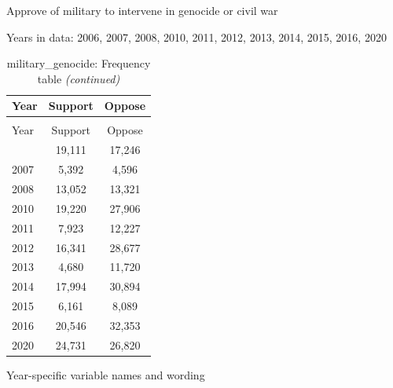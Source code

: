 \documentclass[
  12pt]{article}
\begin{document}
Approve of military to intervene in genocide or civil war

Years in data: 2006, 2007, 2008, 2010, 2011, 2012, 2013, 2014, 2015,
2016, 2020\begingroup\fontsize{10}{12}\selectfont

\begin{longtable}[t]{lcc}
\caption{\label{tab:unnamed-chunk-5}military\_genocide: Frequency table}\\
\toprule
Year & Support & Oppose\\
\midrule
\endfirsthead
\caption[]{military\_genocide: Frequency table \textit{(continued)}}\\
\toprule
Year & Support & Oppose\\
\midrule
\endhead

\endfoot
\bottomrule
\endlastfoot
2006 & 19,111 & 17,246\\
2007 & 5,392 & 4,596\\
2008 & 13,052 & 13,321\\
2010 & 19,220 & 27,906\\
2011 & 7,923 & 12,227\\
2012 & 16,341 & 28,677\\
2013 & 4,680 & 11,720\\
2014 & 17,994 & 30,894\\
2015 & 6,161 & 8,089\\
2016 & 20,546 & 32,353\\
2020 & 24,731 & 26,820\\*
\end{longtable}
\endgroup{}

Year-specific variable names and
wording\begingroup\fontsize{11}{13}\selectfont
\end{document}
